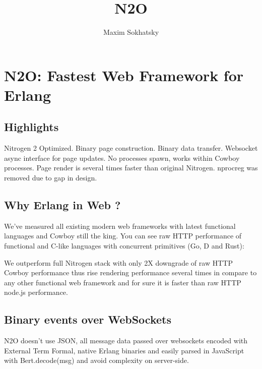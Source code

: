 \documentclass[11pt]{article}
\begin{document}
\title{N2O}
\author{Maxim Sokhatsky}

\paragraph{}
\section*{N2O: Fastest Web Framework for Erlang}

\subsection*{Highlights}
Nitrogen 2 Optimized. Binary page construction.
Binary data transfer. Websocket async interface for
page updates. No processes spawn, works within
Cowboy processes. Page render is several times faster than
original Nitrogen. nprocreg was removed due to gap in design.


\subsection*{Why Erlang in Web ?}
We've measured all existing modern web frameworks with latest functional languages and Cowboy still the king.
You can see raw HTTP performance of functional and C-like languages with concurrent primitives (Go, D and Rust):


We outperform full Nitrogen stack with only 2X downgrade of raw HTTP Cowboy
performance thus rise rendering performance several times in compare to
any other functional web framework and for sure it is faster than raw HTTP node.js performance.

\subsection*{Binary events over WebSockets}
N2O doesn't use JSON, all message data passed over websockets encoded with
External Term Formal, native Erlang binaries and easily parsed in JavaScript
with Bert.decode(msg) and avoid complexity on server-side.
\end{document}
